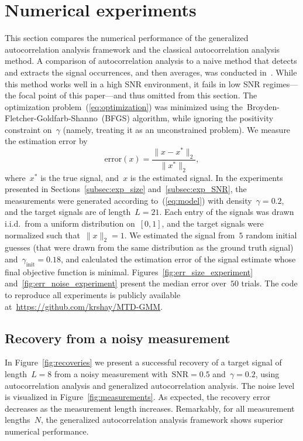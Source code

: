 \documentclass{article}
\begin{document}
\section{Numerical experiments}
\label{sec:numerical}
This section compares the numerical performance of the generalized autocorrelation analysis framework and the classical autocorrelation analysis method. A comparison of autocorrelation analysis {to a naive method that detects and extracts the signal occurrences, and then averages, was} conducted in~\cite{lan2020multi,kreymer2021two}. While this method works well in a high SNR environment, it fails in low SNR regimes---the focal point of this paper---and thus omitted from this section. The optimization problem~(\ref{eq:optimization}) was minimized using the~\mbox{Broyden-Fletcher-Goldfarb-Shanno}~(BFGS) algorithm, while ignoring the positivity constraint on~$\gamma$ (namely, treating it as an unconstrained problem).  We measure the estimation error by
\begin{equation*}
\text{error}(x) = \frac{\|x - x^*\|_2}{\|x^*\|_2},
\end{equation*}
where~$x^*$ is the true signal, and~$x$ is the estimated signal. In the experiments presented in Sections~\ref{subsec:exp_size} and~\ref{subsec:exp_SNR}, the measurements were generated according to~(\ref{eq:model}) with density~\mbox{$\gamma = 0.2$}, and the target signals are of length~\mbox{$L = 21$}. Each entry of the signals was drawn i.i.d.\ from a uniform distribution on~$[0,1]$, and the target signals were normalized such that~$\|x\|_2  =1$. We estimated the signal from~$5$ random initial guesses (that were drawn from the same distribution as the ground truth signal) and~\mbox{$\gamma_{\text{init}} = 0.18$}, and calculated the estimation error of the {signal} estimate whose final objective function is minimal. Figures~\ref{fig:err_size_experiment} and~\ref{fig:err_noise_experiment} present the median error over~$50$ trials. The code to reproduce all experiments is publicly available at~\url{https://github.com/krshay/MTD-GMM}.

\subsection{Recovery from a noisy measurement}
\label{subsec:exp_recovery}
In Figure~\ref{fig:recoveries} we present a successful recovery of a target signal of length~\mbox{$L = 8$} from a noisy measurement with~\mbox{$\text{SNR} = 0.5$} and~\mbox{$\gamma = 0.2$}, using autocorrelation analysis and generalized autocorrelation analysis. The noise level is visualized in Figure~\ref{fig:measurements}.
As expected, the recovery error decreases  as the measurement length increases. Remarkably, for all measurement lengths~$N$, the generalized autocorrelation analysis framework shows superior numerical performance.
\end{document}
